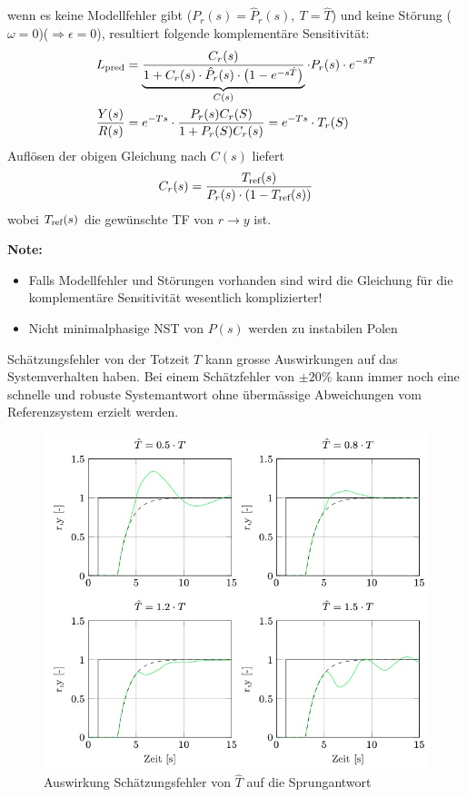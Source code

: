         wenn es keine Modellfehler gibt ($P_r(s) = \hat P_r(s),\ T = \hat T$) und keine Störung ($\omega = 0$)($\Rightarrow \epsilon = 0$), resultiert folgende komplementäre Sensitivität:
        \begin{align*}
            L_{\textnormal{pred}} &= \underbrace{\frac{C_r(s)}{1 + C_r(s)\cdot\hat{P}_r(s)\cdot\big(1 - e^{-s\hat{T}}\big)}}_{C(s)}\cdot P_r(s)\cdot e^{-sT}\\
            \frac{Y(s)}{R(s)} &= e^{-Ts}\cdot\frac{P_r(s)C_r(S)}{1+P_r(S)C_r(s)} = e^{-Ts}\cdot T_r(S)
        \end{align*}
        Auflösen der obigen Gleichung nach $C(s)$ liefert
        \begin{equation*}
            C_r(s) = \frac{T_{\textnormal{ref}}(s)}{P_r(s)\cdot(1-T_{\textnormal{ref}}(s))}
        \end{equation*}
        wobei $T_\textnormal{ref}(s)$ die gewünschte TF von $r\rightarrow y$ ist.
        
        \textbf{Note:} 
        \begin{itemize}
            \item Falls Modellfehler und Störungen vorhanden sind wird die Gleichung für die komplementäre Sensitivität wesentlich komplizierter!
            
            \item Nicht minimalphasige NST von $P(s)$ werden zu instabilen Polen 
        \end{itemize}
        
        Schätzungsfehler von der Totzeit $T$ kann grosse Auswirkungen auf das Systemverhalten haben. Bei einem Schätzfehler von $\pm 20\%$ kann immer noch eine schnelle und robuste Systemantwort ohne übermässige Abweichungen vom Referenzsystem erzielt werden.
        \begin{figure}[H]
            \centering
            \includegraphics[width = 0.7\linewidth]{images/02/est_error_hat_T.jpg}
            \caption{Auswirkung Schätzungsfehler von $\hat{T}$ auf die Sprungantwort}
        \end{figure}
        
